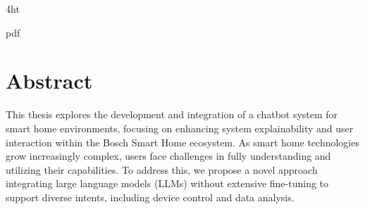 \documentclass[
  a4paper,  %
  twoside,  %
  bibliography=totoc,
  headsepline,
  cleardoublepage=empty,
  parskip=half,
  draft=false
]{scrbook}
\begin{document}
\iftex4ht
  \Configure{$}{\PicMath}{\EndPicMath}{}

  {pdf}
  {%
  }
\fi



\Titelblatt

\pagestyle{preamble}
\renewcommand*{\chapterpagestyle}{preamble}






\section*{Abstract}
This thesis explores the development and integration of a chatbot system for smart home environments, focusing on enhancing system explainability and user interaction within the Bosch Smart Home ecosystem. As smart home technologies grow increasingly complex, users face challenges in fully understanding and utilizing their capabilities. To address this, we propose a novel approach integrating large language models (LLMs) without extensive fine-tuning to support diverse intents, including device control and data analysis.
\end{document}
